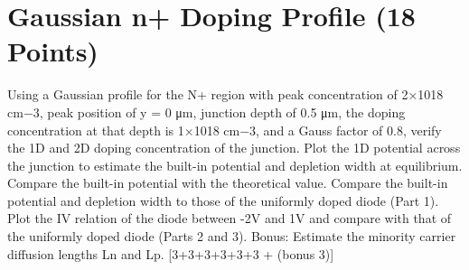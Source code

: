 \documentclass[12pt]{article}
\begin{document}
\section{Gaussian n+ Doping Profile (18 Points)}
Using a Gaussian profile for the N+ region with peak concentration of 2×1018 cm−3, peak position of y = 0 μm, junction depth of 0.5 μm, the doping concentration at that depth is 1×1018 cm−3, and a Gauss factor of 0.8, verify the 1D and 2D doping concentration of the junction. Plot the 1D potential across the junction to estimate the built-in potential and depletion width at equilibrium. Compare the built-in potential with the theoretical value. Compare the built-in potential and depletion width to those of the uniformly doped diode (Part 1). Plot the IV relation of the diode between -2V and 1V and compare with that of the uniformly doped diode (Parts 2 and 3). Bonus: Estimate the minority carrier diffusion lengths Ln and Lp. [3+3+3+3+3+3 + (bonus 3)]
\end{document}
